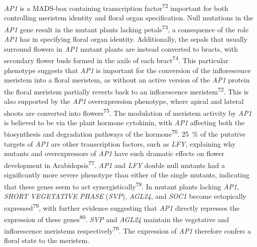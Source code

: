 \documentclass[12pt,]{book}
\begin{document}
\emph{AP1} is a MADS-box containing transcription
factor\textsuperscript{72} important for both controlling meristem
identity and floral organ specification. Null mutations in the
\emph{AP1} gene result in the mutant plants lacking
petals\textsuperscript{73}, a consequence of the role \emph{AP1} has in
specifying floral organ identity. Additionally, the sepals that usually
surround flowers in \emph{AP1} mutant plants are instead converted to
bracts, with secondary flower buds formed in the axils of each
bract\textsuperscript{74}. This particular phenotype suggests that
\emph{AP1} is important for the conversion of the inflorescence meristem
into a floral meristem, as without an active version of the \emph{AP1}
protein the floral meristem partially reverts back to an inflorescence
meristem\textsuperscript{72}. This is also supported by the \emph{AP1}
overexpression phenotype, where apical and lateral shoots are converted
into flowers\textsuperscript{75}. The modulation of meristem activity by
\emph{AP1} is believed to be via the plant hormone cytokinin, with
\emph{AP1} affecting both the biosynthesis and degradation pathways of
the hormone\textsuperscript{76}. 25~\% of the putative targets of
\emph{AP1} are other transcription factors, such as \emph{LFY},
explaining why mutants and overexpressors of \emph{AP1} have such
dramatic effects on flower development in
Arabidopsis\textsuperscript{77}. \emph{AP1} and \emph{LFY} double null
mutants had a significantly more severe phenotype than either of the
single mutants, indicating that these genes seem to act
synergistically\textsuperscript{78}. In mutant plants lacking
\emph{AP1}, \emph{SHORT VEGETATIVE PHASE} (\emph{SVP}), \emph{AGL24},
and \emph{SOC1} become ectopically expressed\textsuperscript{79}, with
further evidence suggesting that \emph{AP1} directly represses the
expression of these genes\textsuperscript{80}. \emph{SVP} and
\emph{AGL24} maintain the vegetative and inflorescence meristems
respectively\textsuperscript{79}. The expression of \emph{AP1} therefore
confers a floral state to the meristem.
\end{document}
